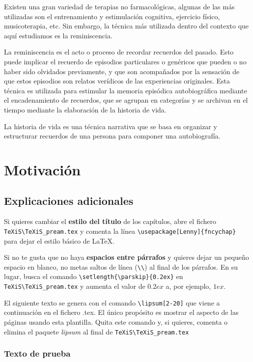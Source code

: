 Existen una gran variedad de terapias no farmacológicas, algunas de las más utilizadas son el entrenamiento y estimulación cognitiva, ejercicio físico, musicoterapia, etc. Sin embargo, la técnica más utilizada dentro del contexto que aquí estudiamos es la reminiscencia.

La reminiscencia es el acto o proceso de recordar recuerdos del pasado. Esto puede implicar el recuerdo de episodios particulares o genéricos que pueden o no haber sido olvidados previamente, y que son acompañados por la sensación de que estos episodios son relatos verídicos de las experiencias originales. Esta técnica es utilizada para estimular la memoria episódica autobiográfica mediante el encadenamiento de recuerdos, que se agrupan en categorías y se archivan en el tiempo mediante la elaboración de la historia de vida.

La historia de vida es una técnica narrativa que se basa en organizar y estructurar recuerdos de una persona para componer una autobiografía.

\section{Motivación}
\subsection{Explicaciones adicionales}
Si quieres cambiar el \textbf{estilo del título} de los capítulos, abre el fichero \verb|TeXiS\TeXiS_pream.tex| y comenta la línea \verb|\usepackage[Lenny]{fncychap}| para dejar el estilo básico de \LaTeX.

Si no te gusta que no haya \textbf{espacios entre párrafos} y quieres dejar un pequeño espacio en blanco, no metas saltos de línea (\verb|\\|) al final de los párrafos. En su lugar, busca el comando  \verb|\setlength{\parskip}{0.2ex}| en \verb|TeXiS\TeXiS_pream.tex| y aumenta el valor de $0.2ex$ a, por ejemplo, $1ex$.

El siguiente texto se genera con el comando \verb|\lipsum[2-20]| que viene a continuación en el fichero .tex. El único propósito es mostrar el aspecto de las páginas usando esta plantilla. Quita este comando y, si quieres, comenta o elimina el paquete \textit{lipsum} al final de \verb|TeXiS\TeXiS_pream.tex|

\subsubsection{Texto de prueba}


\lipsum[2-20]